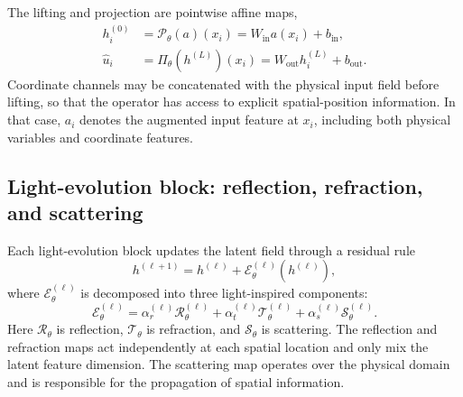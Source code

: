 \documentclass{article}
\newcommand{\cP}{\mathcal{P}}
\newcommand{\cR}{\mathcal{R}}
\newcommand{\cT}{\mathcal{T}}
\newcommand{\cS}{\mathcal{S}}
\newcommand{\cE}{\mathcal{E}}
\begin{document}
The lifting and projection are pointwise affine maps,
\begin{align}
    h_i^{(0)} &= \cP_\theta(a)(x_i)=W_{\mathrm{in}} a(x_i)+b_{\mathrm{in}},
    \label{eq:lifting}\\
    \widehat{u}_i &= \Pi_\theta(h^{(L)})(x_i)=W_{\mathrm{out}}h_i^{(L)}+b_{\mathrm{out}}.
    \label{eq:projection}
\end{align}
Coordinate channels may be concatenated with the physical input field before lifting, so that the operator has access to explicit spatial-position information. In that case, $a_i$ denotes the augmented input feature at $x_i$, including both physical variables and coordinate features.

\subsection{Light-evolution block: reflection, refraction, and scattering}

Each light-evolution block updates the latent field through a residual rule
\begin{equation}
    h^{(\ell+1)} = h^{(\ell)} + \cE_\theta^{(\ell)}(h^{(\ell)}),
    \label{eq:residual-evolution}
\end{equation}
where $\cE_\theta^{(\ell)}$ is decomposed into three light-inspired components:
\begin{equation}
    \cE_\theta^{(\ell)}
    =
    \alpha_r^{(\ell)}\cR_\theta^{(\ell)}
    +
    \alpha_t^{(\ell)}\cT_\theta^{(\ell)}
    +
    \alpha_s^{(\ell)}\cS_\theta^{(\ell)}.
    \label{eq:light-decomposition}
\end{equation}
Here $\cR_\theta$ is reflection, $\cT_\theta$ is refraction, and $\cS_\theta$ is scattering. The reflection and refraction maps act independently at each spatial location and only mix the latent feature dimension. The scattering map operates over the physical domain and is responsible for the propagation of spatial information.

\end{document}
